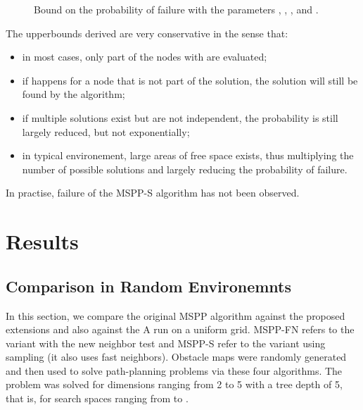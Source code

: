 \documentclass[letterpaper, 10 pt, conference]{ieeeconf}
\theoremstyle{definition}
\begin{document}
\begin{figure}
\caption{Bound on the probability of failure with the parameters , , ,  and .}
\label{fig:prob_bound}
\end{figure}

The upperbounds derived are very conservative in the sense that:
\begin{itemize}
\item in most cases, only part of the nodes  with  are evaluated;
\item if  happens for a node that is not part of the solution, the solution will still be found by the algorithm;
\item if multiple solutions exist but are not independent, the probability is still largely reduced, but not exponentially;
\item in typical environement, large areas of free space exists, thus multiplying the number of possible solutions and largely reducing the probability of failure.
\end{itemize}  
In practise, failure of the MSPP-S algorithm has not been observed.


\section{Results}

\subsection{Comparison in Random Environemnts}

In this section, we compare the original MSPP algorithm against the proposed extensions and also against the A run on a uniform grid.
MSPP-FN refers to the variant with the new neighbor test and MSPP-S refer to the variant using sampling (it also uses fast neighbors).
Obstacle maps were randomly generated and then used to solve path-planning problems via these four algorithms.
The problem was solved for dimensions ranging from 2 to 5 with a tree depth of 5, that is, for search spaces ranging from  to .
\end{document}
